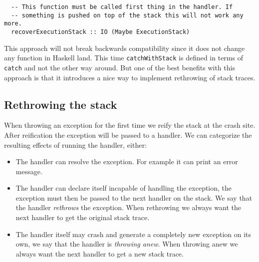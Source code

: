 %
%

\begin{verbatim}
  -- This function must be called first thing in the handler. If
  -- something is pushed on top of the stack this will not work any more.
  recoverExecutionStack :: IO (Maybe ExecutionStack)
\end{verbatim}

This approach will not break backwards compatibility since it does not
change any function in Haskell land. This time \texttt{catchWithStack}
is defined in terms of \texttt{catch} and not the other way around.
But one of the best benefits with this approach is that it introduces a
nice way to implement rethrowing of stack traces.



\subsection{Rethrowing the stack} \label{sec:rethrowing_the_stack}

When throwing an exception for the first time we reify the stack
at the crash site. After reification the exception will be passed to a handler.
We can categorize the resulting effects of running the handler, either:

\begin{itemize}
  \item
    The handler can resolve the exception. For example it can print an
    error message.

  \item
    The handler can declare itself incapable of handling the exception,
    the exception must then be passed to the next handler on the stack.
    We say that the handler \emph{rethrows} the exception. When
    rethrowing we always want the next handler to get the original stack
    trace.

  \item
    The handler itself may crash and generate a completely new exception
    on its own, we say that the handler is \emph{throwing anew}. When
    throwing anew we always want the next handler to get a new stack
    trace.

\end{itemize}

